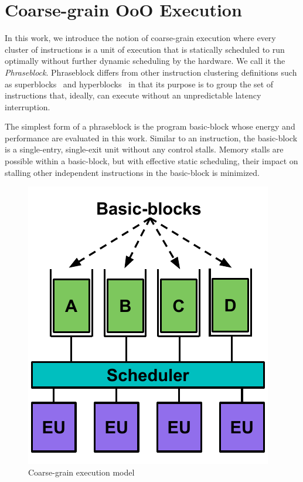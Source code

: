 \section{Coarse-grain OoO Execution}
\label{sec:course_grain}

In this work, we introduce the notion of coarse-grain execution where every
cluster of instructions is a unit of execution that is statically scheduled to
run optimally without further dynamic scheduling by the hardware. We call it the
{\it{Phraseblock}}. Phraseblock differs from other instruction clustering
definitions such as superblocks~\cite{superblock} and
hyperblocks~\cite{hyperblock} in that its purpose is to group the set of
instructions that, ideally, can execute without an unpredictable latency
interruption. 

The simplest form of a phraseblock is the program basic-block whose energy and
performance are evaluated in this work. Similar to an instruction, the
basic-block is a single-entry, single-exit unit without any control stalls.
Memory stalls are possible within a basic-block, but with effective static
scheduling, their impact on stalling other independent instructions in the
basic-block is minimized.

\begin{figure}
	\centering
	\includegraphics[width=0.5\columnwidth]{fig/coarse_grain_sch.pdf} 
	\caption{Coarse-grain execution model}
	\label{fig:coarse_grain_sch}
\end{figure}

